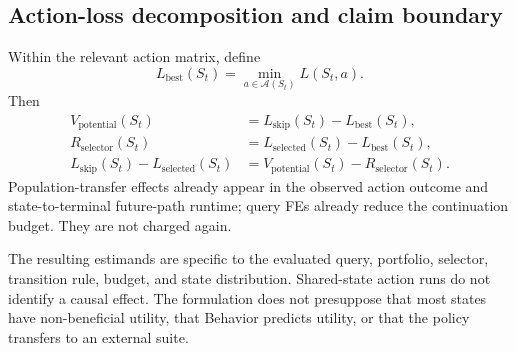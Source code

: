 \subsection{Action-loss decomposition and claim boundary}

Within the relevant action matrix, define
\begin{equation}
  L_{\mathrm{best}}(S_t)=\min_{a\in\mathcal{A}(S_t)}L(S_t,a).
  \label{eq:best-observed-loss}
\end{equation}
Then
\begin{align}
  V_{\mathrm{potential}}(S_t)
  &=L_{\mathrm{skip}}(S_t)-L_{\mathrm{best}}(S_t),\\
  R_{\mathrm{selector}}(S_t)
  &=L_{\mathrm{selected}}(S_t)-L_{\mathrm{best}}(S_t),\\
  L_{\mathrm{skip}}(S_t)-L_{\mathrm{selected}}(S_t)
  &=V_{\mathrm{potential}}(S_t)-R_{\mathrm{selector}}(S_t).
  \label{eq:selector-decomposition}
\end{align}
Population-transfer effects already appear in the observed action outcome and
state-to-terminal future-path runtime; query FEs already reduce the continuation budget.  They
are not charged again.

The resulting estimands are specific to the evaluated query, portfolio,
selector, transition rule, budget, and state distribution.  Shared-state action
runs do not identify a causal effect.  The formulation does not presuppose that
most states have non-beneficial utility, that Behavior predicts utility, or
that the policy transfers to an external suite.
